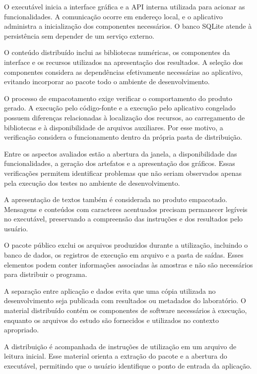O executável inicia a interface gráfica e a API interna utilizada para acionar as funcionalidades. A comunicação ocorre em endereço local, e o aplicativo administra a inicialização dos componentes necessários. O banco SQLite atende à persistência sem depender de um serviço externo.

O conteúdo distribuído inclui as bibliotecas numéricas, os componentes da interface e os recursos utilizados na apresentação dos resultados. A seleção dos componentes considera as dependências efetivamente necessárias ao aplicativo, evitando incorporar ao pacote todo o ambiente de desenvolvimento.

O processo de empacotamento exige verificar o comportamento do produto gerado. A execução pelo código-fonte e a execução pelo aplicativo congelado possuem diferenças relacionadas à localização dos recursos, ao carregamento de bibliotecas e à disponibilidade de arquivos auxiliares. Por esse motivo, a verificação considera o funcionamento dentro da própria pasta de distribuição.

Entre os aspectos avaliados estão a abertura da janela, a disponibilidade das funcionalidades, a geração dos artefatos e a apresentação dos gráficos. Essas verificações permitem identificar problemas que não seriam observados apenas pela execução dos testes no ambiente de desenvolvimento.

A apresentação de textos também é considerada no produto empacotado. Mensagens e conteúdos com caracteres acentuados precisam permanecer legíveis no executável, preservando a compreensão das instruções e dos resultados pelo usuário.

O pacote público exclui os arquivos produzidos durante a utilização, incluindo o banco de dados, os registros de execução em arquivo e a pasta de saídas. Esses elementos podem conter informações associadas às amostras e não são necessários para distribuir o programa.

A separação entre aplicação e dados evita que uma cópia utilizada no desenvolvimento seja publicada com resultados ou metadados do laboratório. O material distribuído contém os componentes de software necessários à execução, enquanto os arquivos do estudo são fornecidos e utilizados no contexto apropriado.

A distribuição é acompanhada de instruções de utilização em um arquivo de leitura inicial. Esse material orienta a extração do pacote e a abertura do executável, permitindo que o usuário identifique o ponto de entrada da aplicação.

